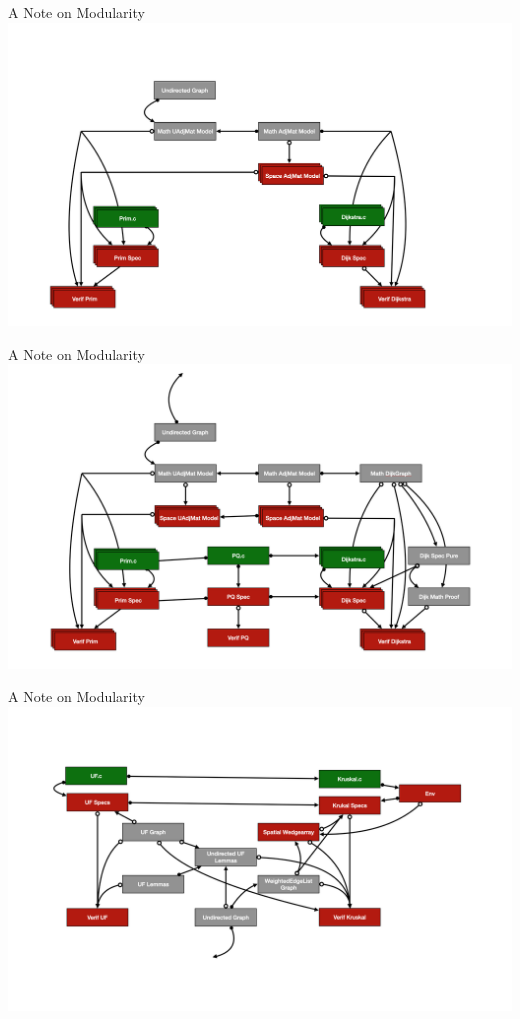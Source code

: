 \documentclass[usenames, xcolor=dvipsnames]{beamer}
\begin{document}
\begin{frame}{A Note on Modularity}
\centering
  \includegraphics[scale=0.33]{simple}
\end{frame}

\begin{frame}{A Note on Modularity}
\centering
  \includegraphics[scale=0.33]{dijk_prim}
\end{frame}

\begin{frame}{A Note on Modularity}
\centering
  \includegraphics[scale=0.33]{krus}
\end{frame}
\end{document}
